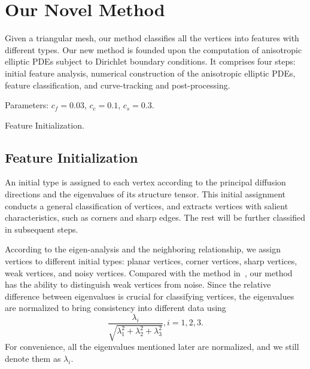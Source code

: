 \documentclass[10pt,journal,cspaper,compsoc]{IEEEtran}
\begin{document}
\section{Our Novel Method}
\label{sec:Ap}

Given a triangular mesh, our method classifies all the vertices into
features with different types. Our new method is founded upon the
computation of anisotropic elliptic PDEs subject to Dirichlet boundary
conditions. It comprises four steps: initial feature analysis,
numerical construction of the anisotropic elliptic PDEs, feature
classification, and curve-tracking and post-processing.

\begin{algorithm}[t]
\SetLine
Parameters: $c_f=0.03$, $c_c=0.1$, $c_s=0.3$.\\
\caption{Feature Initialization.}
\label{initialization}
\end{algorithm}

\subsection{Feature Initialization}
\label{sec:IFA}

An initial type is assigned to each vertex according to the principal
diffusion directions and the eigenvalues of its structure tensor. This
initial assignment conducts a general classification of vertices, and
extracts vertices with salient characteristics, such as corners and
sharp edges. The rest will be further classified in subsequent steps.

According to the eigen-analysis and the neighboring relationship, we
assign vertices to different initial types: planar vertices, corner
vertices, sharp vertices, weak vertices, and noisy vertices. Compared
with the method in~\cite{KCL09}, our method has the ability to
distinguish weak vertices from noise. Since the relative difference
between eigenvalues is crucial for classifying vertices, the
eigenvalues are normalized to bring consistency into different data
using
\begin{equation}\label{eq:normalize}
\frac{\lambda_i}{\sqrt{\lambda^2_1+\lambda^2_2+\lambda^2_3}}, i=1,2,3.
\end{equation}
For convenience, all the eigenvalues mentioned later are normalized,
and we still denote them as $\lambda_i$.
\end{document}
